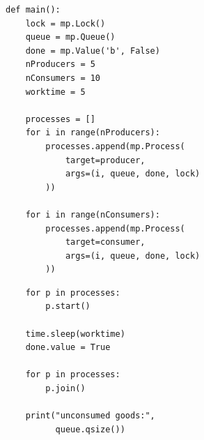 \begin{frame}[fragile]
%
\begin{tcbraster}[raster columns=2,
                  raster equal height,
                  nobeforeafter,
                  raster column skip=0.5cm]
\begin{codebox}
\begin{verbatim}
def main():
    lock = mp.Lock()
    queue = mp.Queue()
    done = mp.Value('b', False)
    nProducers = 5
    nConsumers = 10
    worktime = 5

    processes = []
    for i in range(nProducers):
        processes.append(mp.Process(
            target=producer, 
            args=(i, queue, done, lock)
        ))

    for i in range(nConsumers):
        processes.append(mp.Process(
            target=consumer, 
            args=(i, queue, done, lock)
        ))
\end{verbatim}
\end{codebox}
%
\begin{codebox}
\begin{verbatim}
    for p in processes:
        p.start()

    time.sleep(worktime)
    done.value = True

    for p in processes:
        p.join()

    print("unconsumed goods:",
          queue.qsize())
\end{verbatim}
\end{codebox}
\end{tcbraster}
%
\end{frame}




